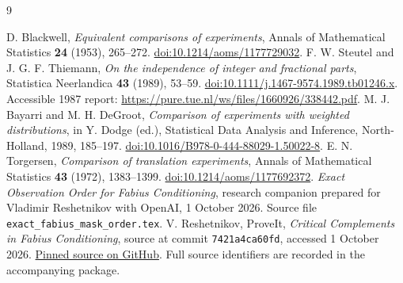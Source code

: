 \documentclass[11pt,a4paper]{article}
\theoremstyle{remark}\newtheorem*{ednote}{Editorial note (ProveIt, 2026-10-01)}
\begin{document}
\begin{thebibliography}{9}\small\raggedright
\setlength{\itemsep}{3pt}\setlength{\parskip}{0pt}
 D. Blackwell, \emph{Equivalent comparisons of experiments}, Annals of Mathematical Statistics \textbf{24} (1953), 265--272. \href{https://doi.org/10.1214/aoms/1177729032}{doi:10.1214/aoms/1177729032}.
 F. W. Steutel and J. G. F. Thiemann, \emph{On the independence of integer and fractional parts}, Statistica Neerlandica \textbf{43} (1989), 53--59. \href{https://doi.org/10.1111/j.1467-9574.1989.tb01246.x}{doi:10.1111/j.1467-9574.1989.tb01246.x}. Accessible 1987 report: \url{https://pure.tue.nl/ws/files/1660926/338442.pdf}.
 M. J. Bayarri and M. H. DeGroot, \emph{Comparison of experiments with weighted distributions}, in Y. Dodge (ed.), Statistical Data Analysis and Inference, North-Holland, 1989, 185--197. \href{https://doi.org/10.1016/B978-0-444-88029-1.50022-8}{doi:10.1016/B978-0-444-88029-1.50022-8}.
 E. N. Torgersen, \emph{Comparison of translation experiments}, Annals of Mathematical Statistics \textbf{43} (1972), 1383--1399. \href{https://doi.org/10.1214/aoms/1177692372}{doi:10.1214/aoms/1177692372}.
 \emph{Exact Observation Order for Fabius Conditioning}, research companion prepared for Vladimir Reshetnikov with OpenAI, 1 October 2026. Source file \texttt{exact\_fabius\_mask\_order.tex}.
 V. Reshetnikov, ProveIt, \emph{Critical Complements in Fabius Conditioning}, source at commit \texttt{7421a4ca60fd}, accessed 1 October 2026. \href{https://github.com/VladimirReshetnikov/ProveIt/blob/7421a4ca60fdf125411edf412f825aac54278b37/Analysis/FabiusFunction/docs/semi-formalized-research-frontiers/drafts/representations/Critical_Complements_Sharp_Information_Loss/article.tex}{Pinned source on GitHub}. Full source identifiers are recorded in the accompanying package.
\end{thebibliography}
\end{document}
